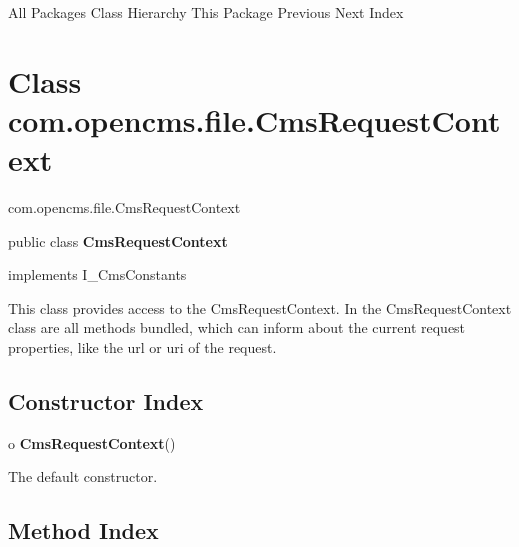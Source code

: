 \begin{PRE}
All Packages  Class Hierarchy  This Package  Previous  Next  Index
\end{PRE}

\htmlHR

\section{  Class com.opencms.file.CmsRequestContext }

\begin{PRE}
com.opencms.file.CmsRequestContext
\end{PRE}

\htmlHR

\begin{description}
\item public class {\bf CmsRequestContext}  
\item implements I\_CmsConstants 
\end{description}

This class provides access to the CmsRequestContext. \htmlBR
In the CmsRequestContext class are all methods bundled, which can inform about
the current request properties, like the url or uri of the request. 

\htmlHR

\subsection*{  Constructor Index }

\begin{description}
\item o {\bf CmsRequestContext}()  

The default constructor. 
\end{description}

\subsection*{  Method Index }

